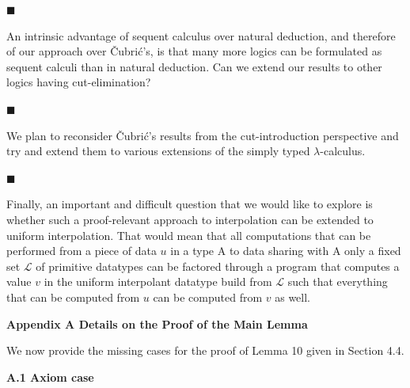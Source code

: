  
 
\par\noindent  $\blacksquare$ 
 
An intrinsic advantage of sequent calculus over natural deduction, and therefore of our approach over Čubrić’s, is that many more logics can be formulated as sequent calculi than in natural deduction. Can we extend our results to other logics having cut-elimination?\par
 
 
 
\par\noindent  $\blacksquare$ 
 
We plan to reconsider Čubrić’s results from the cut-introduction perspective and try and extend them to various extensions of the simply typed $\lambda$-calculus.\par
 
 
 
\par\noindent  $\blacksquare$ 
 
Finally, an important and difficult question that we would like to explore is whether such a proof-relevant approach to interpolation can be extended to uniform interpolation. That would mean that all computations that can be performed from a piece of data $u$ in a type A to data sharing with A only a fixed set $\mathcal{L}$ of primitive datatypes can be factored through a program that computes a value $v$ in the uniform interpolant datatype build from $\mathcal{L}$ such that everything that can be computed from $u$ can be computed from $v$ as well.\par
 
 
  
 


 
\par\medskip\noindent\textbf{Appendix A  Details on the Proof of the Main Lemma}\par
 
 
We now provide the missing cases for the proof of Lemma 10 given in Section 4.4.\par
 
 
 
\par\medskip\noindent\textbf{A.1 Axiom case}\par
 
